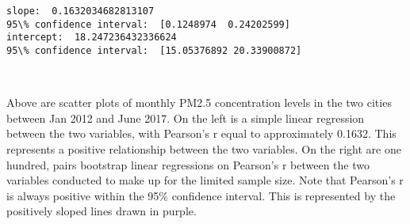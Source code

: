 \documentclass[11pt]{article}
\begin{document}
    \begin{Verbatim}[commandchars=\\\{\}]
slope:  0.1632034682813107
95\% confidence interval:  [0.1248974  0.24202599]
intercept:  18.247236432336624
95\% confidence interval:  [15.05376892 20.33900872]

    \end{Verbatim}

    \begin{center}
    \end{center}
    { \hspace*{\fill} \\}
    
    Above are scatter plots of monthly PM2.5 concentration levels in the two
cities between Jan 2012 and June 2017. On the left is a simple linear
regression between the two variables, with Pearson's r equal to
approximately 0.1632. This represents a positive relationship between
the two variables. On the right are one hundred, pairs bootstrap linear
regressions on Pearson's r between the two variables conducted to make
up for the limited sample size. Note that Pearson's r is always positive
within the 95\% confidence interval. This is represented by the
positively sloped lines drawn in purple.
\end{document}
